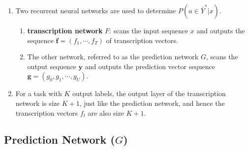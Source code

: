 \begin{enumerate}
    \item Two recurrent neural networks are used to determine $P(a \in \bar{Y}^\ast|x)$.
    \hfill \cite{arxiv/1211.3711/Sequence-Transduction-RNN}
    \begin{enumerate}
        \item \textbf{transcription network} $F$: scans the input sequence $x$ and outputs the sequence $\bm{f} = (f_1, \cdots , f_T )$ of transcription vectors.
        \hfill \cite{arxiv/1211.3711/Sequence-Transduction-RNN}

        \item The other network, referred to as the prediction network $G$, scans the output sequence $\bm{y}$ and outputs the prediction vector sequence $\bm{g} = (g_0, g_1, \cdots , g_U )$.
        \hfill \cite{arxiv/1211.3711/Sequence-Transduction-RNN}
    \end{enumerate}

    \item  For a task with $K$ output labels, the output layer of the transcription network is size $K + 1$, just like the prediction network, and hence the transcription vectors $f_t$ are also size $K + 1$.
    \hfill \cite{arxiv/1211.3711/Sequence-Transduction-RNN}
\end{enumerate}


\subsection{Prediction Network ($G$)}

